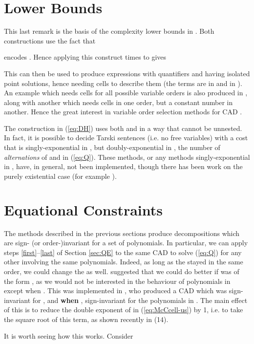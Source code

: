 \documentclass[runningheads,a4paper]{llncs}
\begin{document}
\section{Lower Bounds}
\label{sec:LB}

This last remark is the basis of the complexity lower bounds in \cite{DavenportHeintz1988,BrownDavenport2007}. Both constructions use the fact that

encodes . Hence applying this construct  times to  gives 

This can then be used to produce expressions with  quantifiers and having  isolated point solutions, hence needing  cells to describe them (the  terms are  in \cite{BrownDavenport2007} and  in \cite{DavenportHeintz1988}). 
An example which needs   cells for all possible variable orders is also 
produced in \cite{BrownDavenport2007}, along with another which needs  cells in one order, but a constant number in another.  Hence the great interest in variable order selection methods for CAD \cite[to name a few]{Dolzmannetal2004a,Englandetal2014c,Huangetal2014a}.
\par
The construction in (\ref{eq:DH}) uses both  and  in a way that cannot be unnested. In fact, it is possible \cite{Grigoriev1988} to decide Tarski sentences (i.e. no free variables) with a cost that is singly-exponential in , but doubly-exponential in , the number of \emph{alternations} of  and  in (\ref{eq:Q}). These methods, or any methods singly-exponential in , have, in general, not been implemented, though there has been work on the purely existential case (for example \cite{Huntington2008a}).


\section{Equational Constraints}
\label{sec:EC}

The methods described in the previous sections produce decompositions which are sign- (or order-)invariant for a set of polynomials.  In particular, we can apply steps \ref{first}--\ref{last} of Section \ref{sec:QE} to the same CAD to solve (\ref{eq:Q}) for any other   involving the same polynomials. Indeed, as long as the  stayed in the same order, we could change the  as well. \cite{Collins1998} suggested that we could do better if  was of the form , as we would not be interested in the behaviour of polynomials in  except when . This was implemented in \cite{McCallum1999a}, who produced a CAD which was sign-invariant for , and {\bf when }, sign-invariant for the polynomials in . The main effect of this is to reduce the double exponent  of  in (\ref{eq:McCcell-us}) by 1, i.e. to take the square root of this term, as shown recently in 
\cite{Bradfordetal2014a} (14).
\par
It is worth seeing how this works. Consider
\end{document}
